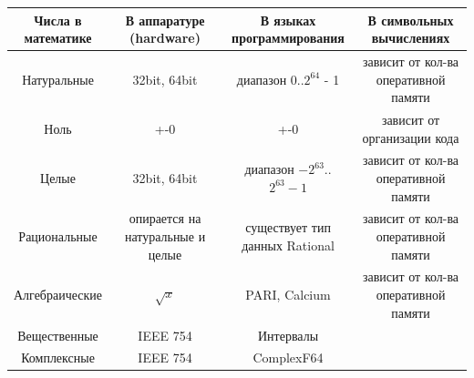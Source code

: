 \documentclass{article}
\begin{document}
\begin{tabular}{|c|c|c|c|}
    \hline
    \rule{0pt}{20pt}\shortstack{Числа в\\математике} & \shortstack{В аппаратуре\\(hardware)} & \shortstack{В языках\\программирования} & \shortstack{В символьных\\вычислениях} \\ \hline
    \rule{0pt}{20pt}Натуральные & 32bit, 64bit & диапазон 0..$2^{64}$ - 1 & \shortstack{зависит от кол-ва\\ оперативной памяти} \\ \hline
    \rule{0pt}{15pt}Ноль & +-0 & +-0 & \shortstack{зависит от \\организации кода} \\ \hline
    \rule{0pt}{20pt}Целые & 32bit, 64bit & диапазон $-2^{63}$..$2^{63}-1$ & \shortstack{зависит от кол-ва\\ оперативной памяти} \\ \hline
    \rule{0pt}{20pt}Рациональные & \shortstack{опирается на \\натуральные и целые} & \shortstack{существует тип \\данных Rational} & \shortstack{зависит от кол-ва\\ оперативной памяти} \\ \hline
    \rule{0pt}{20pt}Алгебраические & $\sqrt{x}$ & PARI, Calcium & \shortstack{зависит от кол-ва\\ оперативной памяти} \\ \hline
    \rule{0pt}{20pt}Вещественные & IEEE 754 & Интервалы &  \\ \hline
    \rule{0pt}{20pt}Комплексные & IEEE 754 & ComplexF64 &  \\ \hline
\end{tabular}
\end{document}
